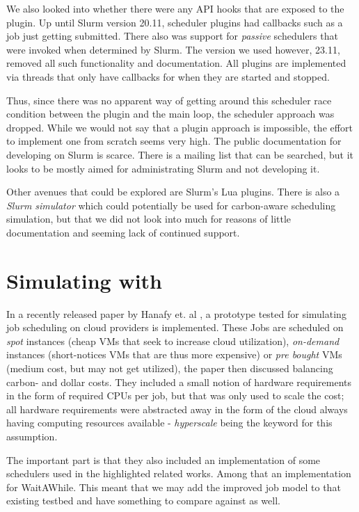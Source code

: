 We also looked into whether there were any API hooks that are exposed to the plugin. 
Up until Slurm version 20.11, scheduler plugins had callbacks such as a job just getting submitted. There also was support for \emph{passive} schedulers that were invoked when determined by Slurm.
The version we used however,  23.11, removed all such functionality and documentation. All plugins are implemented via threads that only have callbacks for when they are started and stopped.

Thus, since there was no apparent way of getting around this scheduler race condition between the plugin and the main loop, the scheduler approach was dropped. 
While we would not say that a plugin approach is impossible, the effort to implement one from scratch seems very high. 
The public documentation for developing on Slurm is scarce. 
There is a mailing list that can be searched, but it looks to be mostly aimed for administrating Slurm and not developing it.

Other avenues that could be explored are Slurm's Lua plugins. 
There is also a \emph{Slurm simulator} which could potentially be used for carbon-aware scheduling simulation, but that we did not look into much for reasons of little documentation and seeming lack of continued support.

\section{Simulating with \programname}

In a recently released paper by Hanafy et. al \cite{hanafy_going_2024}, a prototype tested for simulating job scheduling on cloud providers is implemented. 
These Jobs are scheduled on \emph{spot} instances (cheap VMs that seek to increase cloud utilization), \emph{on-demand} instances (short-notices VMs that are thus more expensive) or \emph{pre bought} VMs (medium cost, but may not get utilized), the paper then discussed balancing carbon- and dollar costs. 
They included a small notion of hardware requirements in the form of required CPUs per job, but that was only used to scale the cost; all hardware requirements were abstracted away in the form of the cloud always having computing resources available - \emph{hyperscale} being the keyword for this assumption.

The important part is that they also included an implementation of some schedulers used in the highlighted related works. Among that an implementation for WaitAWhile\cite{wiesner_lets_2021}.
This meant that we may add the improved job model to that existing testbed and have something to compare against as well.

